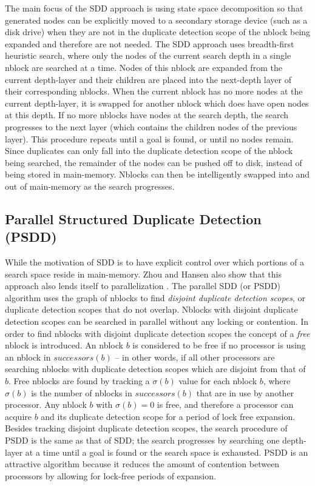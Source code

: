 \documentclass{article}
\begin{document}
The main focus of the SDD approach is using state space decomposition
so that generated nodes can be explicitly moved to a secondary storage
device (such as a disk drive) when they are not in the duplicate
detection scope of the nblock being expanded and therefore are not
needed.  The SDD approach uses breadth-first heuristic search, where
only the nodes of the current search depth in a single nblock are
searched at a time.  Nodes of this nblock are expanded from the
current depth-layer and their children are placed into the next-depth
layer of their corresponding nblocks.  When the current nblock has no
more nodes at the current depth-layer, it is swapped for another
nblock which does have open nodes at this depth.  If no more nblocks
have nodes at the search depth, the search progresses to the next
layer (which contains the children nodes of the previous layer).  This
procedure repeats until a goal is found, or until no nodes
remain. Since duplicates can only fall into the duplicate detection
scope of the nblock being searched, the remainder of the nodes can be
pushed off to disk, instead of being stored in main-memory.  Nblocks
can then be intelligently swapped into and out of main-memory as the
search progresses.

\subsection{Parallel Structured Duplicate Detection (PSDD)}

While the motivation of SDD is to have explicit control over which
portions of a search space reside in main-memory.  Zhou and Hansen
also show that this approach also lends itself to parallelization
\cite{zhou:psd}.  The parallel SDD (or PSDD) algorithm uses the graph
of nblocks to find \emph{disjoint duplicate detection scopes}, or
duplicate detection scopes that do not overlap.  Nblocks with disjoint
duplicate detection scopes can be searched in parallel without any
locking or contention.  In order to find nblocks with disjoint
duplicate detection scopes the concept of a \emph{free} nblock is
introduced.  An nblock $b$ is considered to be free if no processor is
using an nblock in $successors(b)$ -- in other words, if all other
processors are searching nblocks with duplicate detection scopes which
are disjoint from that of $b$.  Free nblocks are found by tracking a
$\sigma(b)$ value for each nblock $b$, where $\sigma(b)$ is the number
of nblocks in $successors(b)$ that are in use by another processor.
Any nblock $b$ with $\sigma(b) = 0$ is free, and therefore a processor
can acquire $b$ and its duplicate detection scope for a period of lock
free expansion.  Besides tracking disjoint duplicate detection scopes,
the search procedure of PSDD is the same as that of SDD; the search
progresses by searching one depth-layer at a time until a goal is
found or the search space is exhausted.  PSDD is an attractive
algorithm because it reduces the amount of contention between
processors by allowing for lock-free periods of expansion.
\end{document}
